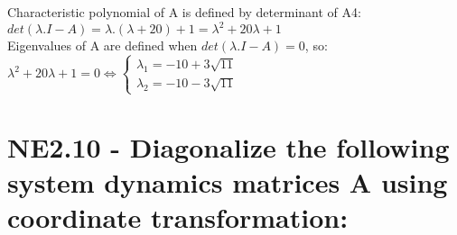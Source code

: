 \documentclass[14pt,a4paper]{article}
\begin{document}
\begin{enumerate}
	Characteristic polynomial of A is defined by determinant of A4:\\
	$det(\lambda .I-A) = \lambda.(\lambda +20) +1 = \lambda^2 + 20\lambda +1$ \\
	Eigenvalues of A are defined when $ det(\lambda .I-A) = 0$, so: \\
	$\lambda^2 + 20\lambda +1 = 0  \Leftrightarrow \begin{cases} \lambda_1 = -10 + 3\sqrt{11}  \\ \lambda_2 = -10 - 3\sqrt{11} \end{cases} $ \\
	
\end{enumerate}
\pagebreak

\section{NE2.10 - Diagonalize the following system dynamics matrices A using coordinate transformation:}
\end{document}
